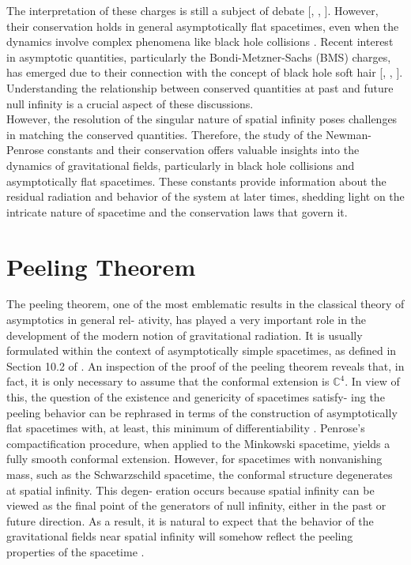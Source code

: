 The interpretation of these charges is still a subject of debate [\cite{PenRin84}, \cite{DaiVal02}, \cite{Bac10}]. However, their conservation holds in
general asymptotically flat spacetimes, even when the dynamics involve complex phenomena like black hole
collisions \cite{DaiVal02}. Recent interest in asymptotic quantities, particularly the Bondi-Metzner-Sachs (BMS) charges,
has emerged due to their connection with the concept of black hole soft hair [\cite{HawMalStr16}, \cite{HawMalStr17}, \cite{HeLyMi15}]. Understanding the relationship between conserved quantities at past and future null infinity is a crucial aspect of these discussions.\\

However, the resolution of the singular nature of spatial infinity poses challenges in matching the conserved
quantities.
Therefore, the study of the Newman-Penrose constants and their conservation offers valuable insights into the
dynamics of gravitational fields, particularly in black hole collisions and asymptotically flat spacetimes. These
constants provide information about the residual radiation and behavior of the system at later times, shedding
light on the intricate nature of spacetime and the conservation laws that govern it.\\

\section{Peeling Theorem}
\label{sec:Peeling Theorem}

The peeling theorem, one of the most emblematic results in the classical theory of asymptotics in general rel-
ativity, has played a very important role in the development of the modern notion of gravitational radiation. It
is usually formulated within the context of asymptotically simple spacetimes, as defined in Section 10.2 of \cite{Val16}.
An inspection of the proof of the peeling theorem reveals that, in fact, it is only necessary to assume that the
conformal extension is $\mathbb{C}^4$. In view of this, the question of the existence and genericity of spacetimes satisfy-
ing the peeling behavior can be rephrased in terms of the construction of asymptotically flat spacetimes with, at least, this minimum of differentiability \cite{GasVal17}. Penrose’s compactification procedure, when applied to the
Minkowski spacetime, yields a fully smooth conformal extension. However, for spacetimes with nonvanishing
mass, such as the Schwarzschild spacetime, the conformal structure degenerates at spatial infinity. This degen-
eration occurs because spatial infinity can be viewed as the final point of the generators of null infinity, either
in the past or future direction. As a result, it is natural to expect that the behavior of the gravitational fields near
spatial infinity will somehow reflect the peeling properties of the spacetime \cite{Pen65a}.\\

